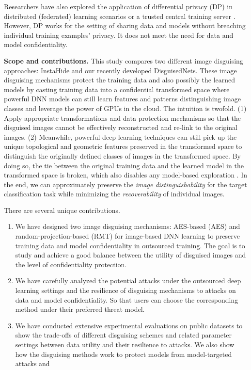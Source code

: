 \documentclass[conference]{IEEEtran}
\begin{document}
Researchers have also explored the application of differential privacy (DP) \cite{dwork06} in distributed (federated) learning scenarios \cite{reza15} or a trusted central training server  \cite{abadi16}. However, DP works for the setting of sharing data and models without breaching individual training examples' privacy. It does not meet the need for data and model confidentiality. 


\textbf{Scope and contributions.} 
This study compares two different image disguising approaches:  InstaHide \cite{huang20} and our recently developed DisguisedNets. These image disguising mechanisms protect the training data and also possibly the learned models by casting training data into a confidential transformed space where powerful DNN models can still learn features and patterns distinguishing image classes and leverage the power of GPUs in the cloud. The intuition is twofold. (1) Apply appropriate transformations and data protection mechanisms so that the disguised images cannot be effectively reconstructed and re-link to the original images. (2) Meanwhile, powerful deep learning techniques can still pick up the unique topological and geometric features preserved in the transformed space to distinguish the originally defined classes of images in the transformed space. By doing so, the tie between the original training data and the learned model in the transformed space is broken, which also disables any model-based exploration \cite{chakraborty18,raff19,shokri16,fredrikson14}. In the end, we can approximately preserve the \emph{image distinguishability} for the target classification task while minimizing the \emph{recoverability} of individual images.


There are several unique contributions. 
\begin{enumerate}
\item We have designed two image disguising mechanisms: AES-based (AES) and random-projection-based (RMT) for image-based DNN learning to preserve training data and model confidentiality in outsourced training. The goal is to study and achieve a good balance between the utility of disguised images and the level of confidentiality protection. 
\item We have carefully analyzed the potential attacks under the outsourced deep learning settings and the resilience of disguising mechanisms to attacks on data and model confidentiality. So that users can choose the corresponding method under their preferred threat model.  
\item 
We have conducted extensive experimental evaluations on public datasets to show the trade-offs of different disguising schemes and related parameter settings between data utility and their resilience to attacks. We also show how the disguising methods work to protect models from model-targeted attacks and 
\end{enumerate}
\end{document}
